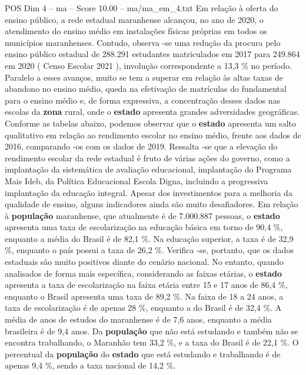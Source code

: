 \begin{textsample}{POS Dim 4 – ma – Score 10.00 – ma/ma\_em\_4.txt}
Em relação à oferta do ensino público, a rede estadual maranhense alcançou, no ano de 2020, o atendimento do ensino médio em instalações físicas próprias em todos os municípios maranhenses.
Contudo, observa -se uma redução da procura pelo ensino público estadual de 288.291 estudantes matriculados em 2017 para 249.864 em 2020 ( Censo Escolar 2021 ), involução correspondente a 13,3 \% no período.
Paralelo a esses avanços, muito se tem a superar em relação às altas taxas de abandono no ensino médio, queda na efetivação de matrículas do fundamental para o ensino médio e, de forma expressiva, a concentração desses dados nas escolas da \textbf{zona} rural, onde o \textbf{estado} apresenta grandes adversidades geográficas.
Conforme as tabelas abaixo, podemos observar que o \textbf{estado} apresenta um salto qualitativo em relação ao rendimento escolar no ensino médio, frente aos dados de 2016, comparando -os com os dados de 2019.
Ressalta -se que a elevação do rendimento escolar da rede estadual é fruto de várias ações do governo, como a implantação da sistemática de avaliação educacional, implantação do Programa Mais Ideb, da Política Educacional Escola Digna, incluindo a progressiva implantação da educação integral.
Apesar dos investimentos para a melhoria da qualidade de ensino, alguns indicadores ainda são muito desafiadores.
Em relação à \textbf{população} maranhense, que atualmente é de 7.000.887 pessoas, o \textbf{estado} apresenta uma taxa de escolarização na educação básica em torno de 90,4 \%, enquanto a média do Brasil é de 82,1 \%.
Na educação superior, a taxa é de 32,9 \%, enquanto o país possui a taxa de 26,2 \%.
Verifica -se, portanto, que os dados estaduais são muito positivos diante do cenário nacional.
No entanto, quando analisados de forma mais específica, considerando as faixas etárias, o \textbf{estado} apresenta a taxa de escolarização na faixa etária entre 15 e 17 anos de 86,4 \%, enquanto o Brasil apresenta uma taxa de 89,2 \%.
Na faixa de 18 a 24 anos, a taxa de escolarização é de apenas 28 \%, enquanto a do Brasil é de 32,4 \%.
A média de anos de estudos do maranhense é de 7,6 anos, enquanto a média brasileira é de 9,4 anos.
Da \textbf{população} que não está estudando e também não se encontra trabalhando, o Maranhão tem 33,2 \%, e a taxa do Brasil é de 22,1 \%.
O percentual da \textbf{população} do \textbf{estado} que está estudando e trabalhando é de apenas 9,4 \%, sendo a taxa nacional de 14,2 \%.

\end{textsample}
